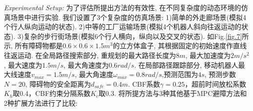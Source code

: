 \documentclass[preprint,5p,times,twocolumn]{elsarticle}
\begin{document}
\textit{Experimental Setup:} 
为了评估所提出方法的有效性, 在不同复杂度的动态环境的仿真场景中进行实验.
我们设置了3个复杂度的仿真场景: 1)简单的外走廊场景(模拟4个行人纵向运动的状态). 2)中等的工厂运输场景(模拟4个机器人斜向往返运动的状态). 3)复杂的步行街场景(模拟6个行人横向，纵向以及交叉的状态).
如Fig.\ref{fig.7}所示, 所有障碍物都是$0.6\times0.6\times1.5m^3$的立方体盒子, 其根据固定的初始速度作直线往返运动. 
在全局路径搜索部分, 重规划的最大路径长度为$8m$, 最大加速度为$2m/s^2$, 最大速度为$1.5m/s$, 最大角速度为$0.6rad/s$.
在局部路径跟踪部分, 移动机器人最大线速度$v_{max}=1.5m/s$, 最大角速度$\omega_{max}=0.8rad/s$,预测范围为$4s$, 预测步数$N=20$, 障碍物的安全距离为$d_{safe}=0.4m$. CBF系数$\gamma=0.25$，超前时间放松系数$K_h$取0.4，CBF约束分隔系数$K_c$取0.3. 
将所提方法与3种其他基于MPC避障方法和2种扩展方法进行了比较: 
\end{document}
